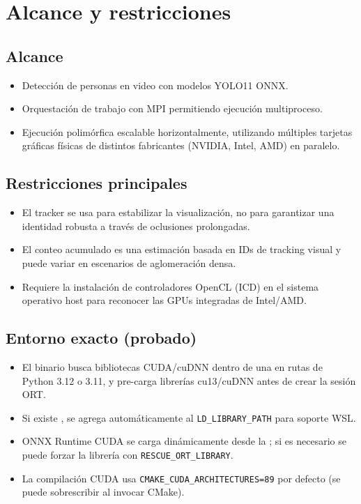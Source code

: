 \documentclass[11pt,a4paper]{article}
\begin{document}
\section{Alcance y restricciones}
\subsection{Alcance}
\begin{itemize}[leftmargin=*]
  \item Detecci\'on de personas en video con modelos YOLO11 ONNX.
  \item Orquestaci\'on de trabajo con MPI permitiendo ejecuci\'on multiproceso.
  \item Ejecuci\'on polim\'orfica escalable horizontalmente, utilizando m\'ultiples tarjetas gr\'aficas f\'isicas de distintos fabricantes (NVIDIA, Intel, AMD) en paralelo.
\end{itemize}

\subsection{Restricciones principales}
\begin{itemize}[leftmargin=*]
  \item El tracker se usa para estabilizar la visualizaci\'on, no para garantizar una identidad robusta a trav\'es de oclusiones prolongadas.
  \item El conteo acumulado es una estimaci\'on basada en IDs de tracking visual y puede variar en escenarios de aglomeraci\'on densa.
  \item Requiere la instalaci\'on de controladores OpenCL (ICD) en el sistema operativo host para reconocer las GPUs integradas de Intel/AMD.
\end{itemize}

\subsection{Entorno exacto (probado)}
\begin{itemize}[leftmargin=*]
  \item El binario busca bibliotecas CUDA/cuDNN dentro de una  en rutas de Python 3.12 o 3.11, y pre-carga librer\'ias cu13/cuDNN antes de crear la sesi\'on ORT.
  \item Si existe , se agrega autom\'aticamente al \texttt{LD\_LIBRARY\_PATH} para soporte WSL.
  \item ONNX Runtime CUDA se carga din\'amicamente desde la ; si es necesario se puede forzar la librer\'ia con \texttt{RESCUE\_ORT\_LIBRARY}.
  \item La compilaci\'on CUDA usa \texttt{CMAKE\_CUDA\_ARCHITECTURES=89} por defecto (se puede sobrescribir al invocar CMake).
\end{itemize}
\end{document}
